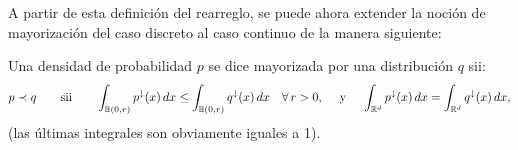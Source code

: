 A partir de esta definici\'on del rearreglo, se puede ahora extender la noci\'on
de mayorizaci\'on del caso discreto al caso continuo de la manera siguiente:
%
\begin{definicion}
\label{Def:MP:MayorizacionContinua}
%
Una densidad de  probabilidad $p$ se dice mayorizada  por una distribuci\'on $q$
sii:
  \[
  p \prec  q \qquad \mbox{sii}  \qquad \int_{\mathbb{B}(0,r)} p^\downarrow(x) \,  dx \le
  \int_{\mathbb{B}(0,r)} q^\downarrow(x) \, dx \quad \forall  \, r > 0, \quad \mbox{ y }
  \quad \int_{\mathbb{R}^d} p^\downarrow(x) \, dx = \int_{\mathbb{R}^d} q^\downarrow(x) \,
  dx,
  \]
  (las \'ultimas integrales son obviamente iguales a 1).
\end{definicion}
%
